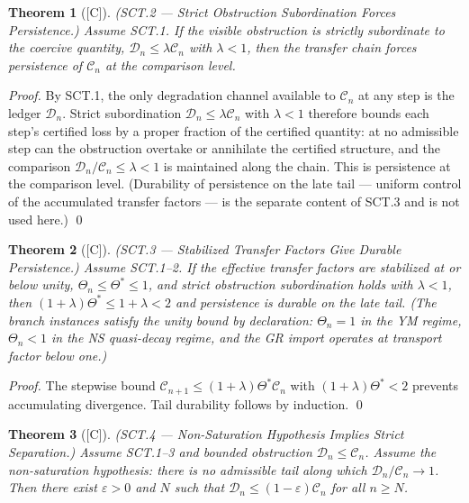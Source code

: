 \documentclass[12pt,oneside]{amsbook}
\theoremstyle{plain}
\newtheorem{theorem}{Theorem}[section]
\theoremstyle{definition}
\theoremstyle{remark}
\newcommand{\status}[1]{\textup{[#1]}}
\begin{document}
\begin{theorem}[\status{C}]\label{thm:SCT2}
\textup{(SCT.2 --- Strict Obstruction Subordination Forces Persistence.)}
Assume SCT.1.  If the visible obstruction is strictly subordinate to
the coercive quantity,
$\mathcal{D}_n \leq \lambda \mathcal{C}_n$ with $\lambda < 1$,
then the transfer chain forces persistence of $\mathcal{C}_n$ at the
comparison level.
\end{theorem}

\begin{proof}
By SCT.1, the only degradation channel available to
$\mathcal{C}_n$ at any step is the ledger $\mathcal{D}_n$.  Strict
subordination $\mathcal{D}_n \leq \lambda\mathcal{C}_n$ with
$\lambda < 1$ therefore bounds each step's certified loss by a
proper fraction of the certified quantity: at no admissible step can
the obstruction overtake or annihilate the certified structure, and
the comparison $\mathcal{D}_n / \mathcal{C}_n \leq \lambda < 1$
is maintained along the chain.  This is persistence at the
comparison level.  (Durability of persistence on the late tail ---
uniform control of the accumulated transfer factors --- is the
separate content of SCT.3 and is not used here.) \qed
\end{proof}

\begin{theorem}[\status{C}]\label{thm:SCT3}
\textup{(SCT.3 --- Stabilized Transfer Factors Give Durable
Persistence.)}
Assume SCT.1--2.  If the effective transfer factors are
\emph{stabilized at or below unity},
$\Theta_n \leq \Theta^* \leq 1$, and strict obstruction
subordination holds with $\lambda < 1$, then
$(1+\lambda)\Theta^* \leq 1+\lambda < 2$ and persistence is
durable on the late tail.  (The branch instances satisfy the
unity bound by declaration: $\Theta_n = 1$ in the YM regime,
$\Theta_n < 1$ in the NS quasi-decay regime, and the GR import
operates at transport factor below one.)
\end{theorem}

\begin{proof}
The stepwise bound $\mathcal{C}_{n+1} \leq (1+\lambda)\Theta^*
\mathcal{C}_n$ with $(1+\lambda)\Theta^* < 2$ prevents accumulating
divergence.  Tail durability follows by induction. \qed
\end{proof}

\begin{theorem}[\status{C}]\label{thm:SCT4}
\textup{(SCT.4 --- Non-Saturation Hypothesis Implies Strict
Separation.)}
Assume SCT.1--3 and bounded obstruction $\mathcal{D}_n \leq
\mathcal{C}_n$.  Assume the \emph{non-saturation hypothesis}: there
is no admissible tail along which $\mathcal{D}_n / \mathcal{C}_n \to
1$.  Then there exist $\varepsilon > 0$ and $N$ such that
$\mathcal{D}_n \leq (1-\varepsilon)\mathcal{C}_n$ for all $n \geq N$.
\end{theorem}
\end{document}
